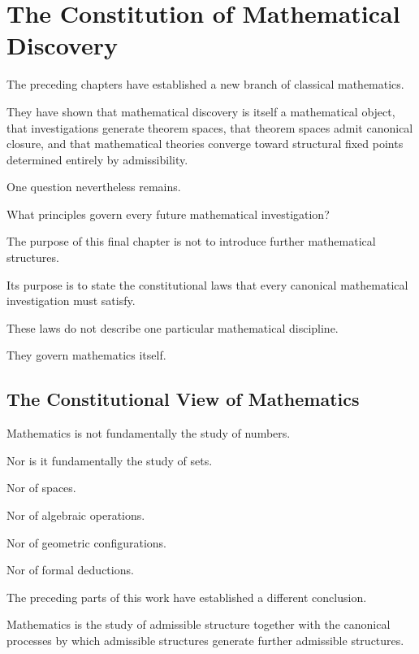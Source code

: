 \documentclass[13pt,openany]{book}
\theoremstyle{plain}
\theoremstyle{definition}
\begin{document}
\chapter{The Constitution of Mathematical Discovery}

The preceding chapters have established a new branch of classical mathematics.

They have shown that mathematical discovery is itself a mathematical object,
that investigations generate theorem spaces, that theorem spaces admit
canonical closure, and that mathematical theories converge toward structural
fixed points determined entirely by admissibility.

One question nevertheless remains.

What principles govern every future mathematical investigation?

The purpose of this final chapter is not to introduce further mathematical
structures.

Its purpose is to state the constitutional laws that every canonical
mathematical investigation must satisfy.

These laws do not describe one particular mathematical discipline.

They govern mathematics itself.

\section{The Constitutional View of Mathematics}

Mathematics is not fundamentally the study of numbers.

Nor is it fundamentally the study of sets.

Nor of spaces.

Nor of algebraic operations.

Nor of geometric configurations.

Nor of formal deductions.

The preceding parts of this work have established a different conclusion.

Mathematics is the study of admissible structure together with the canonical
processes by which admissible structures generate further admissible
structures.
\end{document}
